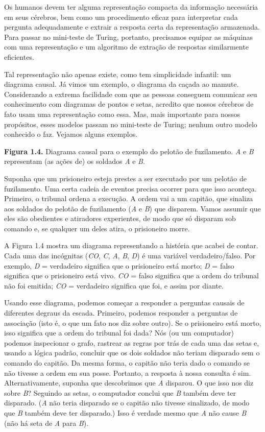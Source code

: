 \documentclass[11pt,a5paper,twoside]{book}
\begin{document}
Os humanos devem ter alguma representação compacta da informação necessária em seus cérebros, bem como um procedimento eficaz para interpretar cada pergunta adequadamente e extrair a resposta certa da representação armazenada. Para passar no mini-teste de Turing, portanto, precisamos equipar as máquinas com uma representação e um algoritmo de extração de respostas similarmente eficientes.

Tal representação não apenas existe, como tem simplicidade infantil: um diagrama causal. Já vimos um exemplo, o diagrama da caçada ao mamute. Considerando a extrema facilidade com que as pessoas conseguem comunicar seu conhecimento com diagramas de pontos e setas, acredito que nossos cérebros de fato usam uma representação como essa. Mas, mais importante para nossos propósitos, esses modelos passam no mini-teste de Turing; nenhum outro modelo conhecido o faz. Vejamos alguns exemplos.

\textbf{Figura 1.4.} Diagrama causal para o exemplo do pelotão de fuzilamento. \textit{A} e \textit{B} representam (as ações de) os soldados \textit{A} e \textit{B}.

Suponha que um prisioneiro esteja prestes a ser executado por um pelotão de fuzilamento. Uma certa cadeia de eventos precisa ocorrer para que isso aconteça. Primeiro, o tribunal ordena a execução. A ordem vai a um capitão, que sinaliza aos soldados do pelotão de fuzilamento (\textit{A} e \textit{B}) que disparem. Vamos assumir que eles são obedientes e atiradores experientes, de modo que só disparam sob comando e, se qualquer um deles atira, o prisioneiro morre.

A Figura 1.4 mostra um diagrama representando a história que acabei de contar. Cada uma das incógnitas (\textit{CO}, \textit{C}, \textit{A}, \textit{B}, \textit{D}) é uma variável verdadeiro/falso. Por exemplo, \textit{D} = verdadeiro significa que o prisioneiro está morto; \textit{D} = falso significa que o prisioneiro está vivo. \textit{CO} = falso significa que a ordem do tribunal não foi emitida; \textit{CO} = verdadeiro significa que foi, e assim por diante.

Usando esse diagrama, podemos começar a responder a perguntas causais de diferentes degraus da escada. Primeiro, podemos responder a perguntas de associação (isto é, o que um fato nos diz sobre outro). Se o prisioneiro está morto, isso significa que a ordem do tribunal foi dada? Nós (ou um computador) podemos inspecionar o grafo, rastrear as regras por trás de cada uma das setas e, usando a lógica padrão, concluir que os dois soldados não teriam disparado sem o comando do capitão. Da mesma forma, o capitão não teria dado o comando se não tivesse a ordem em sua posse. Portanto, a resposta à nossa consulta é sim. Alternativamente, suponha que descobrimos que \textit{A} disparou. O que isso nos diz sobre \textit{B}? Seguindo as setas, o computador conclui que \textit{B} também deve ter disparado. (\textit{A} não teria disparado se o capitão não tivesse sinalizado, de modo que \textit{B} também deve ter disparado.) Isso é verdade mesmo que \textit{A} não cause \textit{B} (não há seta de \textit{A} para \textit{B}).
\end{document}
